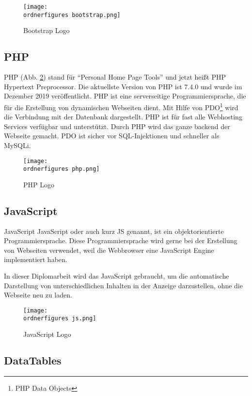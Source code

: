 \begin{figure}[H]
	\centering
	\texttt{[image: \\ordnerfigures bootstrap.png]}
	\caption{Bootstrap Logo \cite{40_bootstrap_img}}
	\label{fi:bootstrap}
\end{figure}

\subsection{PHP}
PHP (Abb. \ref{fi:php}) stand f\"{u}r \textquotedblleft{}Personal Home Page Tools\textquotedblright{} und jetzt hei\ss{}t PHP Hypertext Preprocessor. Die aktuellste Version von PHP ist 7.4.0 und wurde im Dezember 2019 ver\"{o}ffentlicht. PHP ist eine serverseitige Programmiersprache, die f\"{u}r die Erstellung von dynamischen Webseiten dient. Mit Hilfe von PDO\footnote{PHP Data Objects} wird die Verbindung mit der Datenbank dargestellt. PHP ist f\"{u}r fast alle Webhosting Services verf\"{u}gbar und unterst\"{u}tzt. 
Durch PHP wird das ganze backend der Webseite gemacht. PDO ist sicher vor SQL-Injektionen und schneller als MySQLi.



\begin{figure}[H]
	\centering
	\texttt{[image: \\ordnerfigures php.png]}
	\caption{PHP Logo \cite{40_php_img}}
	\label{fi:php}
\end{figure}


\subsection{JavaScript}
JavaScript JavaScript oder auch kurz JS genannt, ist ein objektorientierte Programmiersprache. Diese Programmiersprache wird gerne bei der Erstellung von Webseiten verwendet, weil die Webbrowser eine JavaScript Engine implementiert haben. \cite{40_js}

In dieser Diplomarbeit wird das JavaScript gebraucht, um die automatische Darstellung von unterschiedlichen Inhalten in der Anzeige darzustellen, ohne die Webseite neu zu laden.


\begin{figure}[H]
	\centering
	\texttt{[image: \\ordnerfigures js.png]}
	\caption{JavaScript Logo \cite{40_js_img}}
	\label{fi:js}
\end{figure}



\subsection{DataTables}

